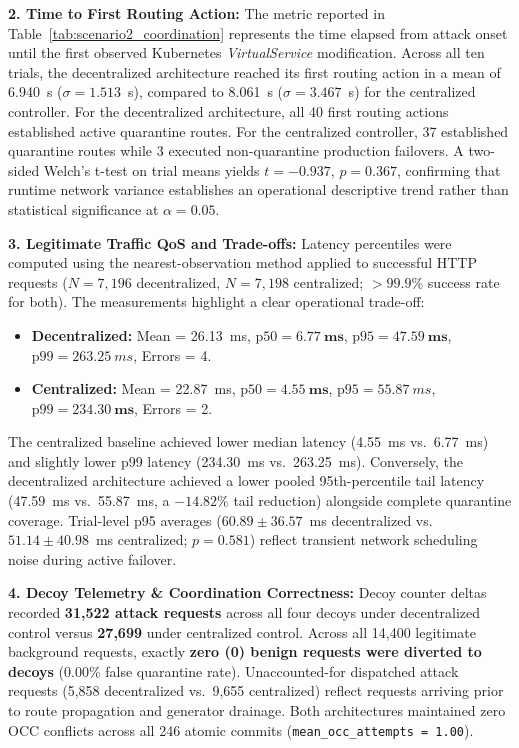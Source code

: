 \textbf{2. Time to First Routing Action:} The metric reported in Table~\ref{tab:scenario2_coordination} represents the time elapsed from attack onset until the first observed Kubernetes \textit{VirtualService} modification. Across all ten trials, the decentralized architecture reached its first routing action in a mean of 6.940~s ($\sigma = 1.513$~s), compared to 8.061~s ($\sigma = 3.467$~s) for the centralized controller. For the decentralized architecture, all 40 first routing actions established active quarantine routes. For the centralized controller, 37 established quarantine routes while 3 executed non-quarantine production failovers. A two-sided Welch's t-test on trial means yields $t = -0.937$, $p = 0.367$, confirming that runtime network variance establishes an operational descriptive trend rather than statistical significance at $\alpha = 0.05$.

\textbf{3. Legitimate Traffic QoS and Trade-offs:} Latency percentiles were computed using the nearest-observation method applied to successful HTTP requests ($N=7,196$ decentralized, $N=7,198$ centralized; $>99.9\%$ success rate for both). The measurements highlight a clear operational trade-off:
\begin{itemize}
    \item \textbf{Decentralized:} Mean = 26.13~ms, $\text{p50} = \mathbf{6.77~ms}$, $\text{p95} = \mathbf{47.59~ms}$, $\text{p99} = 263.25~ms$, Errors = 4.
    \item \textbf{Centralized:} Mean = 22.87~ms, $\text{p50} = \mathbf{4.55~ms}$, $\text{p95} = 55.87~ms$, $\text{p99} = \mathbf{234.30~ms}$, Errors = 2.
\end{itemize}
The centralized baseline achieved lower median latency (4.55~ms vs.\ 6.77~ms) and slightly lower p99 latency (234.30~ms vs.\ 263.25~ms). Conversely, the decentralized architecture achieved a lower pooled 95th-percentile tail latency (47.59~ms vs.\ 55.87~ms, a $-14.82\%$ tail reduction) alongside complete quarantine coverage. Trial-level p95 averages ($60.89 \pm 36.57$~ms decentralized vs.\ $51.14 \pm 40.98$~ms centralized; $p = 0.581$) reflect transient network scheduling noise during active failover.

\textbf{4. Decoy Telemetry & Coordination Correctness:} Decoy counter deltas recorded \textbf{31,522 attack requests} across all four decoys under decentralized control versus \textbf{27,699} under centralized control. Across all 14,400 legitimate background requests, exactly \textbf{zero (0) benign requests were diverted to decoys} (0.00\% false quarantine rate). Unaccounted-for dispatched attack requests (5,858 decentralized vs.\ 9,655 centralized) reflect requests arriving prior to route propagation and generator drainage. Both architectures maintained zero OCC conflicts across all 246 atomic commits (\texttt{mean\_occ\_attempts = 1.00}).
